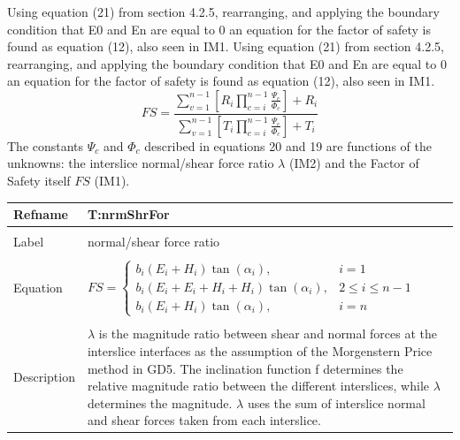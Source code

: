 \documentclass[12pt]{article}
\begin{document}
Using equation (21) from section 4.2.5, rearranging, and applying the boundary condition that E0 and En are equal to 0 an equation for the factor of safety is found as equation (12), also seen in IM1. Using equation (21) from section 4.2.5, rearranging, and applying the boundary condition that E0 and En are equal to 0 an equation for the factor of safety is found as equation (12), also seen in IM1.
\begin{equation}
FS=\frac{\displaystyle\sum_{v=1}^{n-1}{\left[R_{i}\displaystyle\prod_{c=i}^{n-1}{\frac{\Psi{}_{c}}{\Phi{}_{c}}}\right]}+R_{i}}{\displaystyle\sum_{v=1}^{n-1}{\left[T_{i}\displaystyle\prod_{c=i}^{n-1}{\frac{\Psi{}_{c}}{\Phi{}_{c}}}\right]}+T_{i}}
\end{equation}
The constants $\Psi{}_{c}$ and $\Phi{}_{c}$ described in equations 20 and 19 are functions of the unknowns: the interslice normal/shear force ratio $\lambda{}$ (IM2) and the Factor of Safety itself $FS$ (IM1).
~\newline
\noindent \begin{minipage}{\textwidth}
\begin{tabular}{p{} p{}}
\toprule \textbf{Refname} & \textbf{T:nrmShrFor}
\label{T:nrmShrFor}
\\ \midrule \\
Label & normal/shear force ratio
\\ \midrule \\
Equation & $FS=\begin{cases}
b_{i}\left(E_{i}+H_{i}\right)\tan\left(\alpha{}_{i}\right), & i=1\\
b_{i}\left(E_{i}+E_{i}+H_{i}+H_{i}\right)\tan\left(\alpha{}_{i}\right), & 2\leq{}i\leq{}n-1\\
b_{i}\left(E_{i}+H_{i}\right)\tan\left(\alpha{}_{i}\right), & i=n
\end{cases}$
\\ \midrule \\
Description & $\lambda{}$ is the magnitude ratio between shear and normal forces at the interslice interfaces as the assumption of the Morgenstern Price method in GD5. The inclination function f determines the relative magnitude ratio between the different interslices, while $\lambda{}$ determines the magnitude. $\lambda{}$ uses the sum of interslice normal and shear forces taken from each interslice.
\\ \bottomrule \end{tabular}
\end{minipage}\\
\end{document}
